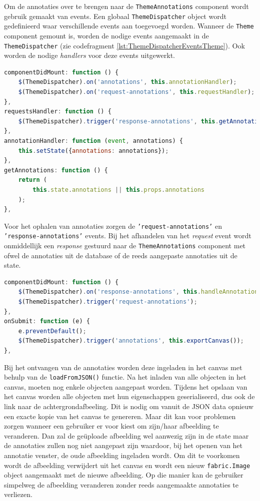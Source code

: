 Om de annotaties over te brengen naar de \texttt{ThemeAnnotations} component wordt gebruik gemaakt van events. Een globaal \texttt{ThemeDispatcher} object wordt gedefinieerd waar verschillende events aan toegevoegd worden. Wanneer de \texttt{Theme} component gemount is, worden de nodige events aangemaakt in de \texttt{ThemeDispatcher} (zie codefragment \ref{lst:ThemeDispatcherEventsTheme}). Ook worden de nodige \textit{handlers} voor deze events uitgewerkt.

\begin{lstlisting}[caption={Theme component - events},label=lst:ThemeDispatcherEventsTheme,language=javascript]
componentDidMount: function () {
	$(ThemeDispatcher).on('annotations', this.annotationHandler);
	$(ThemeDispatcher).on('request-annotations', this.requestHandler);
},
requestsHandler: function () {
	$(ThemeDispatcher).trigger('response-annotations', this.getAnnotations());
},
annotationHandler: function (event, annotations) {
	this.setState({annotations: annotations});
},
getAnnotations: function () {
	return (
		this.state.annotations || this.props.annotations
	);
},
\end{lstlisting}

Voor het ophalen van annotaties zorgen de \texttt{'request-annotations'} en \texttt{'response-annotations'} events. Bij het afhandelen van het \textit{request} event wordt onmiddellijk een \textit{response} gestuurd naar de \texttt{ThemeAnnotations} component met ofwel de annotaties uit de database of de reeds aangepaste annotaties uit de state. 

\begin{lstlisting}[caption={ThemeAnnotations component - events},label=lst:ThemeDispatcherEventsThemeAnnotations,language=javascript]
componentDidMount: function () {
  	$(ThemeDispatcher).on('response-annotations', this.handleAnnotations);
	$(ThemeDispatcher).trigger('request-annotations');
},
onSubmit: function (e) {
	e.preventDefault();
	$(ThemeDispatcher).trigger('annotations', this.exportCanvas());
},
\end{lstlisting}

Bij het ontvangen van de annotaties worden deze ingeladen in het canvas met behulp van de \texttt{loadFromJSON()} functie. Na het inladen van alle objecten in het canvas, moeten nog enkele objecten aangepast worden. Tijdens het opslaan van het canvas worden alle objecten met hun eigenschappen geserialiseerd, dus ook de link naar de achtergrondafbeeling. Dit is nodig om vanuit de JSON data opnieuw een exacte kopie van het canvas te genereren. Maar dit kan voor problemen zorgen wanneer een gebruiker er voor kiest om zijn/haar afbeelding te veranderen. Dan zal de ge\"{u}ploade afbeelding wel aanwezig zijn in de state maar de annotaties zullen nog niet aangepast zijn waardoor, bij het openen van het annotatie venster, de oude afbeelding ingeladen wordt. Om dit te voorkomen wordt de afbeelding verwijdert uit het canvas en wordt een nieuw \texttt{fabric.Image} object aangemaakt met de nieuwe afbeelding. Op die manier kan de gebruiker simpelweg de afbeelding veranderen zonder reeds aangemaakte annotaties te verliezen. 

